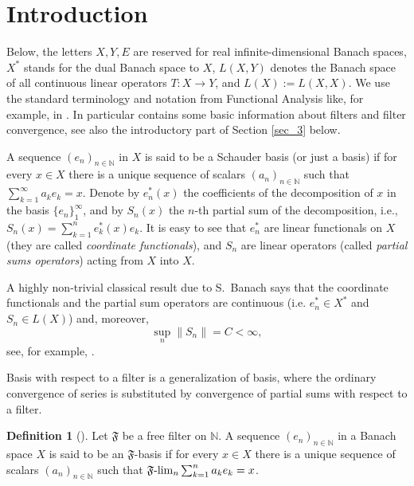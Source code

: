\documentclass[11pt,twoside, reqno]{amsart}
\theoremstyle{plain}
\theoremstyle{remark}
\theoremstyle{definition}
\newtheorem{definition}[theorem]{Definition}
\numberwithin{equation}{section}
\begin{document}

\section{Introduction}

Below, the letters $X,Y,E$ are reserved for real infinite-dimensional Banach spaces, $X^*$ stands for the dual Banach space to $X$, $L(X,Y)$ denotes the Banach space of all continuous linear operators $T: X \to Y$, and $L(X) :=L(X,X)$. We use the standard terminology and notation from Functional Analysis like, for example, in \cite{kadbook}. In particular \cite[Section 16.1]{kadbook} contains some basic information about filters and filter convergence, see also the introductory part of Section \ref{sec_3} below.

A sequence $(e_n)_{n \in \mathbb N}$ in $X$ is said to be a Schauder basis (or just a basis) if for every $x \in X$ there is a unique sequence of scalars $(a_n)_{n \in \mathbb N}$  such that $ \sum_{k=1}^\infty a_k e_k = x$. Denote by $e_n^* (x)$ the coefficients of the decomposition of $x$ in the basis $\{{e_n}\}_1^\infty$, and by $S_n (x)$ the $n$-th partial sum of the decomposition, i.e., $S_n (x) = \sum\limits_{k=1}^n {e_k^* (x)e_k}$. It is easy to see that  $e_n^*$ are linear functionals on $X$ (they are called \emph{coordinate functionals}), and $S_n$ are linear operators (called \emph{partial sums operators}) acting from $X$ into $X$.

A highly non-trivial classical result due to S.~Banach says that the coordinate functionals and the partial sum operators are continuous (i.e. $e_n^*\in X^*$ and $S_n \in L(X)$) and, moreover, 
\begin{equation} \label{intr-eq1}
\sup_n \|{S_n}\| = C < \infty, 
\end{equation}
see, for example, \cite[Section 10.5.2]{kadbook}.  

Basis with respect to a filter is a generalization of basis, where the ordinary convergence of series is substituted by convergence of partial sums with respect to a filter.

\begin{definition}[\cite{gakad}] \label{defF-bas}
 Let $\mathfrak F$ be a free filter on $\mathbb N$. A sequence $(e_n)_{n \in \mathbb N}$ in a Banach space $X$ is said to be an $\mathfrak F$-basis if for every $x \in X$ there is a unique sequence of scalars $(a_n)_{n \in \mathbb N}$  such that $\mathfrak F\)-\(\lim_n \sum_{k=1}^n a_k e_k = x$.
\end{definition}
\end{document}
